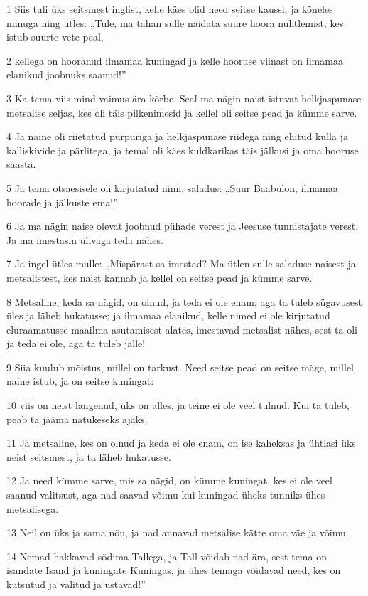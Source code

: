 \par 1 Siis tuli üks seitsmest inglist, kelle käes olid need seitse kaussi, ja kõneles minuga ning ütles: „Tule, ma tahan sulle näidata suure hoora nuhtlemist, kes istub suurte vete peal,
\par 2 kellega on hooranud ilmamaa kuningad ja kelle hooruse viinast on ilmamaa elanikud joobnuks saanud!”
\par 3 Ka tema viis mind vaimus ära kõrbe. Seal ma nägin naist istuvat helkjaspunase metsalise seljas, kes oli täis pilkenimesid ja kellel oli seitse pead ja kümme sarve.
\par 4 Ja naine oli riietatud purpuriga ja helkjaspunase riidega ning ehitud kulla ja kalliskivide ja pärlitega, ja temal oli käes kuldkarikas täis jälkusi ja oma hooruse saasta.
\par 5 Ja tema otsaesisele oli kirjutatud nimi, saladus: „Suur Baabülon, ilmamaa hoorade ja jälkuste ema!”
\par 6 Ja ma nägin naise olevat joobnud pühade verest ja Jeesuse tunnistajate verest. Ja ma imestasin üliväga teda nähes.
\par 7 Ja ingel ütles mulle: „Mispärast sa imestad? Ma ütlen sulle saladuse naisest ja metsalistest, kes naist kannab ja kellel on seitse pead ja kümme sarve.
\par 8 Metsaline, keda sa nägid, on olnud, ja teda ei ole enam; aga ta tuleb sügavusest üles ja läheb hukatusse; ja ilmamaa elanikud, kelle nimed ei ole kirjutatud eluraamatusse maailma asutamisest alates, imestavad metsalist nähes, sest ta oli ja teda ei ole, aga ta tuleb jälle!
\par 9 Siia kuulub mõistus, millel on tarkust. Need seitse pead on seitse mäge, millel naine istub, ja on seitse kuningat:
\par 10 viis on neist langenud, üks on alles, ja teine ei ole veel tulnud. Kui ta tuleb, peab ta jääma natukeseks ajaks.
\par 11 Ja metsaline, kes on olnud ja keda ei ole enam, on ise kaheksas ja ühtlasi üks neist seitsmest, ja ta läheb hukatusse.
\par 12 Ja need kümme sarve, mis sa nägid, on kümme kuningat, kes ei ole veel saanud valitsust, aga nad saavad võimu kui kuningad üheks tunniks ühes metsalisega.
\par 13 Neil on üks ja sama nõu, ja nad annavad metsalise kätte oma väe ja võimu.
\par 14 Nemad hakkavad sõdima Tallega, ja Tall võidab nad ära, sest tema on isandate Isand ja kuningate Kuningas, ja ühes temaga võidavad need, kes on kutsutud ja valitud ja ustavad!”
